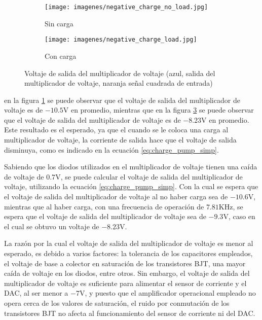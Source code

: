     \begin{figure}[H]
        \centering

        \begin{subfigure}{0.45\textwidth}
            \centering
            \texttt{[image: imagenes/negative\_charge\_no\_load.jpg]}
            \caption{Sin carga}
            \label{fig:out_multiplicador_no_load}
        \end{subfigure}
        \begin{subfigure}{0.45\textwidth}
            \centering
            \texttt{[image: imagenes/negative\_charge\_load.jpg]}
            \caption{Con carga}
            \label{fig:out_multiplicador_load}
        \end{subfigure}
        \caption{Voltaje de salida del multiplicador de voltaje (azul, salida del multiplicador de voltaje, naranja señal cuadrada
        de entrada)}
    \end{figure}
    
    en la figura \ref{fig:out_multiplicador_no_load} se puede observar que
    el voltaje de salida del multiplicador de voltaje es de $-10.5\text{V}$ en 
    promedio, mientras que en la figura \ref{fig:out_multiplicador_load} se
    puede observar que el voltaje de salida del multiplicador de voltaje es de
    $-8.23\text{V}$ en promedio. Este resultado es el esperado, ya que el
    cuando se le coloca una carga al multiplicador de voltaje, la corriente
    de salida hace que el voltaje de salida disminuya, como es indicado en la 
    ecuación \ref{eq:charge_pump_simp}.

    Sabiendo que los diodos utilizados en el multiplicador de voltaje tienen
    una caída de voltaje de $0.7\text{V}$, se puede calcular el voltaje de
    salida del multiplicador de voltaje, utilizando la ecuación \ref{eq:charge_pump_simp}.
    Con la cual se espera que el voltaje de salida del multiplicador de voltaje
    al no haber carga sea de $-10.6\text{V}$, mientras que al haber carga, con
    una frecuencia de operación de $7.81\text{KHz}$, se espera que el voltaje
    de salida del multiplicador de voltaje sea de $-9.3\text{V}$, caso en el 
    cual se obtuvo un voltaje de $-8.23\text{V}$.
    
    La razón por la cual el voltaje de salida del multiplicador de voltaje es menor al esperado,
     es debido a varios factores: la tolerancia de los capacitores empleados, el voltaje de 
    base a colector en saturación de los transistores BJT, una mayor caída de voltaje en los diodos,
    entre otros. Sin embargo, el voltaje de salida del multiplicador de voltaje
    es suficiente para alimentar el sensor de corriente y el DAC, al ser
    menor a $-7\text{V}$, y puesto que el amplificador operacional empleado no 
    opera cerca de los valores de saturación, el ruido por conmutación
    de los transistores BJT no afecta al funcionamiento del sensor de corriente
    ni del DAC.



